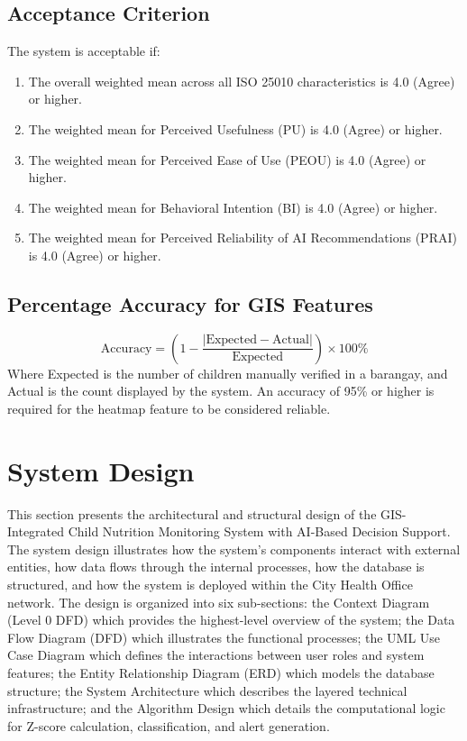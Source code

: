 \documentclass[12pt, a4paper]{report}
\begin{document}
\subsection{Acceptance Criterion}
\label{subsec:acceptance}
The system is acceptable if:
\begin{enumerate}
    \item The overall weighted mean across all ISO 25010 characteristics is 4.0 (Agree) or higher.
    \item The weighted mean for Perceived Usefulness (PU) is 4.0 (Agree) or higher.
    \item The weighted mean for Perceived Ease of Use (PEOU) is 4.0 (Agree) or higher.
    \item The weighted mean for Behavioral Intention (BI) is 4.0 (Agree) or higher.
    \item The weighted mean for Perceived Reliability of AI Recommendations (PRAI) is 4.0 (Agree) or higher.
\end{enumerate}

\subsection{Percentage Accuracy for GIS Features}
\label{subsec:accuracy}
\begin{equation}
    \text{Accuracy} = \left(1 - \frac{|\text{Expected} - \text{Actual}|}{\text{Expected}}\right) \times 100\%
\end{equation}
Where Expected is the number of children manually verified in a barangay, and Actual is the count displayed by the system. An accuracy of 95\% or higher is required for the heatmap feature to be considered reliable.

\section{System Design}
\label{sec:system_design}
This section presents the architectural and structural design of the GIS-Integrated Child Nutrition Monitoring System with AI-Based Decision Support. The system design illustrates how the system's components interact with external entities, how data flows through the internal processes, how the database is structured, and how the system is deployed within the City Health Office network.
The design is organized into six sub-sections: the Context Diagram (Level 0 DFD) which provides the highest-level overview of the system; the Data Flow Diagram (DFD) which illustrates the functional processes; the UML Use Case Diagram which defines the interactions between user roles and system features; the Entity Relationship Diagram (ERD) which models the database structure; the System Architecture which describes the layered technical infrastructure; and the Algorithm Design which details the computational logic for Z-score calculation, classification, and alert generation.
\end{document}
